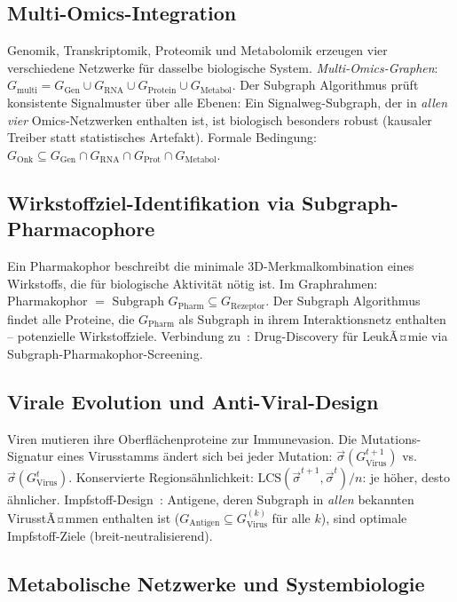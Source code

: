 ﻿\documentclass[a4paper,12pt]{article}
\theoremstyle{plain}
\theoremstyle{definition}
\theoremstyle{remark}
\newcommand{\sigvec}{\vec{\sigma}}
\begin{document}
\subsection{Multi-Omics-Integration}

Genomik, Transkriptomik, Proteomik und Metabolomik erzeugen vier
verschiedene Netzwerke f\"ur dasselbe biologische System.
\emph{Multi-Omics-Graphen}: $G_{\mathrm{multi}} = G_{\mathrm{Gen}} \cup
G_{\mathrm{RNA}} \cup G_{\mathrm{Protein}} \cup G_{\mathrm{Metabol}}$.
Der Subgraph Algorithmus pr\"uft konsistente Signalmuster \"uber alle Ebenen:
Ein Signalweg-Subgraph, der in \emph{allen vier} Omics-Netzwerken
enthalten ist, ist biologisch besonders robust (kausaler Treiber statt
statistisches Artefakt).
Formale Bedingung:
$G_{\mathrm{Onk}} \subseteq G_{\mathrm{Gen}} \cap G_{\mathrm{RNA}} \cap
G_{\mathrm{Prot}} \cap G_{\mathrm{Metabol}}$.

\subsection{Wirkstoffziel-Identifikation via Subgraph-Pharmacophore}

Ein Pharmakophor beschreibt die minimale 3D-Merkmalkombination eines
Wirkstoffs, die f\"ur biologische Aktivit\"at n\"otig ist.
Im Graphrahmen: Pharmakophor $= $ Subgraph $G_{\mathrm{Pharm}} \subseteq G_{\mathrm{Rezeptor}}$.
Der Subgraph Algorithmus findet alle Proteine, die $G_{\mathrm{Pharm}}$
als Subgraph in ihrem Interaktionsnetz enthalten -- potenzielle Wirkstoffziele.
Verbindung zu~\cite{epp2026gen,epp2026bloodc}: Drug-Discovery f\"ur
LeukÃ¤mie via Subgraph-Pharmakophor-Screening.

\subsection{Virale Evolution und Anti-Viral-Design}

Viren mutieren ihre Oberfl\"achenproteine zur Immunevasion.
Die Mutations-Signatur eines Virusstamms \"andert sich bei jeder
Mutation: $\sigvec(G_{\mathrm{Virus}}^{t+1})$ vs.\ $\sigvec(G_{\mathrm{Virus}}^t)$.
Konservierte Regions\"ahnlichkeit:
$\mathrm{LCS}(\sigvec^{t+1}, \sigvec^t) / n$: je h\"oher, desto \"ahnlicher.
Impfstoff-Design~\cite{epp2026norovirus}: Antigene, deren Subgraph
in \emph{allen} bekannten VirusstÃ¤mmen enthalten ist
($G_{\mathrm{Antigen}} \subseteq G_{\mathrm{Virus}}^{(k)}$ f\"ur alle $k$),
sind optimale Impfstoff-Ziele (breit-neutralisierend).

\subsection{Metabolische Netzwerke und Systembiologie}
\end{document}
